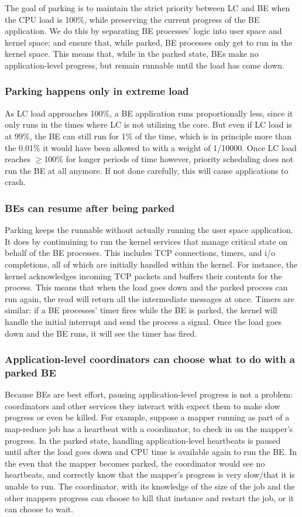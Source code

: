 The goal of parking is to maintain the strict priority between LC and BE when
the CPU load is 100\%, while preserving the current progress of the BE
application. We do this by separating BE processes' logic into user space and
kernel space; and ensure that, while parked, BE processes only get to run in the
kernel space. This means that, while in the parked state, BEs make no
application-level progress, but remain runnable until the load has come down.

\subsubsection{Parking happens only in extreme load}
As LC load approaches 100\%, a BE application runs proportionally less, since it
only runs in the times where LC is not utilizing the core. But even if LC load
is at 99\%, the BE can still run for 1\% of the time, which is in principle more
than the 0.01\% it would have been allowed to with a weight of 1/10000. Once LC
load reaches $\geq$100\% for longer periods of time however, priority scheduling
does not run the BE at all anymore. If not done carefully, this will cause
applications to crash.

\subsubsection{BEs can resume after being parked }
Parking keeps the runnable without actually running the user space application.
It does by continuining to run the kernel services that manage critical state on
behalf of the BE processes. This includes TCP connections, timers, and i/o
completions, all of which are initially handled within the kernel. For instance,
the kernel acknowledges incoming TCP packets and buffers their contents for the
process. This means that when the load goes down and the parked process can run
again, the read will return all the intermediate messages at once. Timers are
similar: if a BE processes' timer fires while the BE is parked, the kernel will
handle the initial interrupt and send the process a signal. Once the load goes
down and the BE runs, it will see the timer has fired.

\subsubsection{Application-level coordinators can choose what to do with a
parked BE} Because BEs are best effort, pausing application-level progress is
not a problem: coordinators and other services they interact with expect them to
make slow progress or even be killed. For example, suppose a mapper running as
part of a map-reduce job has a heartbeat with a coordinator, to check in on the
mapper's progress. In the parked state, handling application-level heartbeats is
paused until after the load goes down and CPU time is available again to run the
BE. In the even that the mapper becomes parked, the coordinator would see no
heartbeats, and correctly know that the mapper's progress is very slow/that it
is unable to run. The coordinator, with its knowledge of the size of the job and
the other mappers progress can choose to kill that instance and restart the job,
or it can choose to wait.

